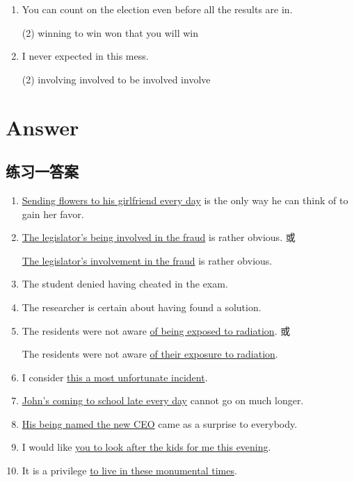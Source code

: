 \begin{enumerate}
\item You can count on \ttu the election even before all the results are in.
\begin{tasks}(2)
  \task winning
  \task to win
  \task won
  \task that you will win
\end{tasks}

\item I never expected \ttu in this mess.
\begin{tasks}(2)
  \task involving
  \task involved
  \task to be involved
  \task involve
\end{tasks}

\end{enumerate}
\section{Answer}
\subsection{练习一答案}
\begin{enumerate}

\item \ul{Sending flowers to his girlfriend every day} is the only way he can think
  of to gain her favor.

\item \ul{The legislator's being involved in the fraud} is rather obvious. 或

  \ul{The legislator's involvement in the fraud} is rather obvious.

\item The student denied having cheated in the exam.

\item The researcher is certain about having found a solution.

\item The residents were not aware \ul{of being exposed to radiation}. 或

  The residents were not aware \ul{of their exposure to radiation}.

\item I consider \ul{this a most unfortunate incident}.

\item \ul{John's coming to school late every day} cannot go on much longer.

\item \ul{His being named the new CEO} came as a surprise to everybody.

\item I would like \ul{you to look after the kids for me this evening}.

\item It is a privilege \ul{to live in these monumental times}.

\end{enumerate}

